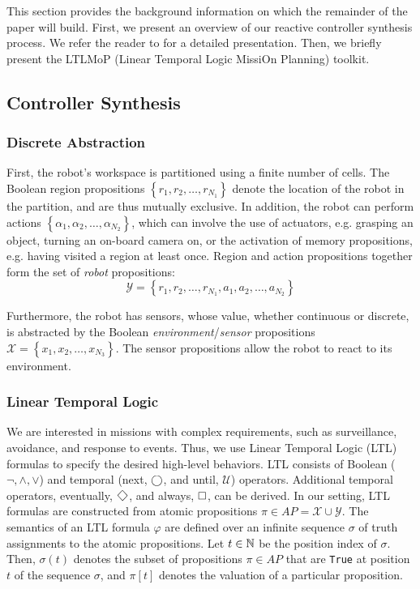 This section provides the background information on which the remainder of the paper will build. First, we present an overview of our reactive controller synthesis process. We refer the reader to \cite{KGFP_TRO09} for a detailed presentation. Then, we briefly present the LTLMoP (Linear Temporal Logic MissiOn Planning) toolkit.

\subsection{Controller Synthesis}\label{preliminariesA}

\subsubsection*{Discrete Abstraction}\label{discreteAbs}

First, the robot's workspace is partitioned using a finite number of cells. The Boolean region propositions $\left\{r_1, r_2, \ldots, r_{N_1} \right\}$ denote the location of the robot in the partition, and are thus mutually exclusive. In addition, the robot can perform actions $\left\{\alpha_1, \alpha_2, \ldots, \alpha_{N_2} \right\}$, which can involve the use of actuators, e.g. grasping an object, turning an on-board camera on, or the activation of memory propositions, e.g. having visited a region at least once. Region and action propositions together form the set of \emph{robot} propositions:
 \begin{equation*}
 	\mathcal{Y} = \left\{ r_1, r_2, \ldots, r_{N_1}, a_1, a_2, \ldots, a_{N_2} \right\}
 \end{equation*}

Furthermore, the robot has sensors, whose value, whether continuous or discrete, is abstracted by the Boolean \emph{environment}/\emph{sensor} propositions $\mathcal{X} = \left\{ x_1, x_2, \ldots, x_{N_3} \right\}$. 
The sensor propositions allow the robot to react to its environment. 

\subsubsection*{Linear Temporal Logic}\label{LTL}

We are interested in missions with complex requirements, such as surveillance, avoidance, and response to events. 
Thus, we use Linear Temporal Logic (LTL) formulas to specify the desired high-level behaviors. LTL consists of Boolean ($\neg, \wedge, \lor$) and temporal (next, $\operatorname{\bigcirc}$, and until, $\mathcal{U}$) operators. 
Additional temporal operators, eventually, $\F$, and always, $\operatorname{\Box}$, can be derived. 
In our setting, LTL formulas are constructed from atomic propositions $\pi \in AP = \mathcal{X} \cup \mathcal{Y}$. 
The semantics of an LTL formula $\varphi$ are defined over an infinite sequence $\sigma$ of truth assignments to the atomic propositions. 
Let $t \in \mathbb{N}$ be the position index of $\sigma$. Then, $\sigma (t)$ denotes the subset of propositions $\pi \in AP$ that are \texttt{True} at position $t$ of the sequence $\sigma$, and $\pi [t]$ denotes the valuation of a particular proposition.

